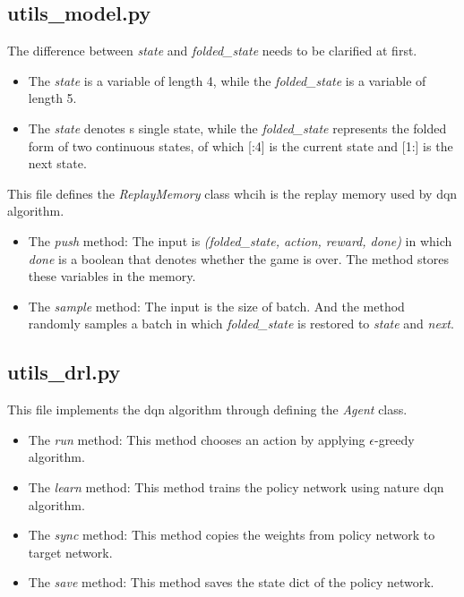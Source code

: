 \documentclass[a4paper, 11pt]{article}
\begin{document}
\subsection{utils\_model.py}
The difference between \emph{state} and \emph{folded\_state}
needs to be clarified at first.
\begin{itemize}\setlength{\itemsep}{-\itemsep}
      \item The \emph{state} is a variable of length 4,
            while the \emph{folded\_state} is a variable of length 5.
      \item The \emph{state} denotes s single state,
            while the \emph{folded\_state} represents the folded form
            of two continuous states,
            of which [:4] is the current state and [1:] is the next state.
\end{itemize}

This file defines the \emph{ReplayMemory} class
whcih is the replay memory used by dqn algorithm.
\begin{itemize}\setlength{\itemsep}{-\itemsep}
      \item The \emph{push} method:
            The input is \emph{(folded\_state, action, reward, done)}
            in which \emph{done} is a boolean
            that denotes whether the game is over.
            The method stores these variables in the memory.
      \item The \emph{sample} method:
            The input is the size of batch.
            And the method randomly samples a batch
            in which \emph{folded\_state} is restored to
            \emph{state} and \emph{next}.
\end{itemize}

\subsection{utils\_drl.py}
This file implements the dqn algorithm
through defining the \emph{Agent} class.
\begin{itemize}\setlength{\itemsep}{-\itemsep}
      \item The \emph{run} method:
            This method chooses an action by applying
            $\epsilon$-greedy algorithm.
      \item The \emph{learn} method:
            This method trains the policy network using nature dqn algorithm.
      \item The \emph{sync} method:
            This method copies the weights
            from policy network to target network.
      \item The \emph{save} method:
            This method saves the state dict of the policy network.
\end{itemize}
\end{document}

